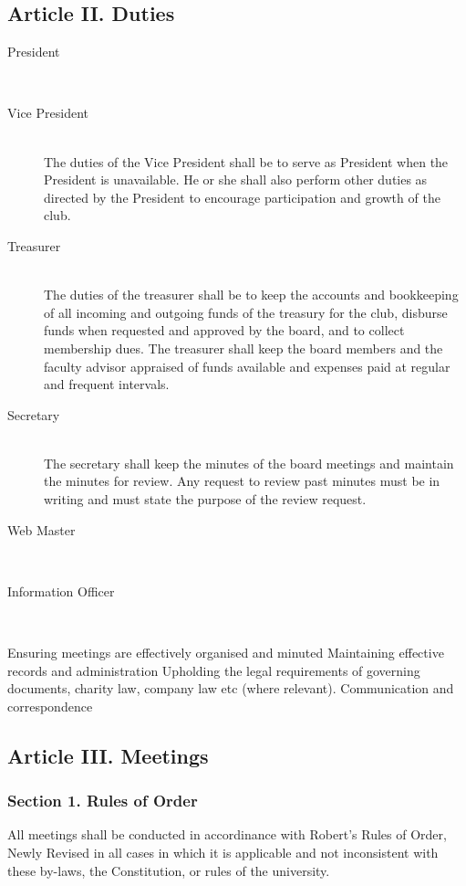 \documentclass{article}
\begin{document}
  \subsection{Article II. Duties}
    \begin{description}
        \item[President] ~\\
        \item[Vice President] ~\\
          The duties of the Vice President shall be to serve as President when the President is unavailable. He or she shall also perform other duties as directed by the President to encourage participation and growth of the club.

        \item[Treasurer] ~\\
          The duties of the treasurer shall be to keep the accounts and bookkeeping of all incoming and outgoing funds of the treasury for the club, disburse funds when requested and approved by the board, and to collect membership dues. The treasurer shall keep the board members and the faculty advisor appraised of funds available and expenses paid at regular and frequent intervals.

        \item[Secretary] ~\\
          The secretary shall keep the minutes of the board meetings and maintain the minutes for review. Any request to review past minutes must be in writing and must state the purpose of the review request.
        \item[Web Master] ~\\

        \item[Information Officer] ~\\

        \end{description}

      Ensuring meetings are effectively organised and minuted
      Maintaining effective records and administration
      Upholding the legal requirements of governing documents, charity law, company law etc (where relevant).
      Communication and correspondence

  \subsection{Article III. Meetings}

    \subsubsection{Section 1. Rules of Order}
      All meetings shall be conducted in accordinance with Robert's Rules of Order, Newly Revised in all cases in which it is applicable and not inconsistent with these by-laws, the Constitution, or rules of the university.
\end{document}
